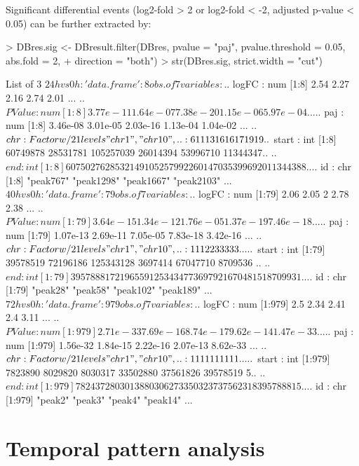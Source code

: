 \documentclass[a4paper]{article}
\begin{document}
Significant differential events (log2-fold > 2 or log2-fold < -2, adjusted p-value < 0.05) can be further extracted by:
\begin{Schunk}
\begin{Sinput}
> DBres.sig <- DBresult.filter(DBres, pvalue = "paj", pvalue.threshold = 0.05, abs.fold = 2,
+                             direction = "both")
> str(DBres.sig, strict.width =  "cut")
\end{Sinput}
\begin{Soutput}
List of 3
 $ 24hvs0h:'data.frame':	8 obs. of  7 variables:
  ..$ logFC : num [1:8] 2.54 2.27 2.16 2.74 2.01 ...
  ..$ PValue: num [1:8] 3.77e-11 1.64e-07 7.38e-20 1.15e-06 5.97e-04 ...
  ..$ paj   : num [1:8] 3.46e-08 3.01e-05 2.03e-16 1.13e-04 1.04e-02 ...
  ..$ chr   : Factor w/ 21 levels "chr1","chr10",..: 6 11 13 16 16 17 19 19
  ..$ start : int [1:8] 60749878 28531781 105257039 26014394 53996710 11344347..
  ..$ end   : int [1:8] 60750276 28532149 105257992 26014703 53996920 11344388..
  ..$ id    : chr [1:8] "peak767" "peak1298" "peak1667" "peak2103" ...
 $ 40hvs0h:'data.frame':	79 obs. of  7 variables:
  ..$ logFC : num [1:79] 2.06 2.05 2 2.78 2.38 ...
  ..$ PValue: num [1:79] 3.64e-15 1.34e-12 1.76e-05 1.37e-19 7.46e-18 ...
  ..$ paj   : num [1:79] 1.07e-13 2.69e-11 7.05e-05 7.83e-18 3.42e-16 ...
  ..$ chr   : Factor w/ 21 levels "chr1","chr10",..: 1 1 1 2 2 3 3 3 3 3 ...
  ..$ start : int [1:79] 39578519 72196186 125343128 3697414 67047710 8709536 ..
  ..$ end   : int [1:79] 39578881 72196559 125343477 3697921 67048151 8709931 ..
  ..$ id    : chr [1:79] "peak28" "peak58" "peak102" "peak189" ...
 $ 72hvs0h:'data.frame':	979 obs. of  7 variables:
  ..$ logFC : num [1:979] 2.5 2.34 2.41 2.4 3.11 ...
  ..$ PValue: num [1:979] 2.71e-33 7.69e-16 8.74e-17 9.62e-14 1.47e-33 ...
  ..$ paj   : num [1:979] 1.56e-32 1.84e-15 2.22e-16 2.07e-13 8.62e-33 ...
  ..$ chr   : Factor w/ 21 levels "chr1","chr10",..: 1 1 1 1 1 1 1 1 1 1 ...
  ..$ start : int [1:979] 7823890 8029820 8030317 33502880 37561826 39578519 5..
  ..$ end   : int [1:979] 7824372 8030138 8030627 33503237 37562318 39578881 5..
  ..$ id    : chr [1:979] "peak2" "peak3" "peak4" "peak14" ...
\end{Soutput}
\end{Schunk}
\section{Temporal pattern analysis}
\end{document}
